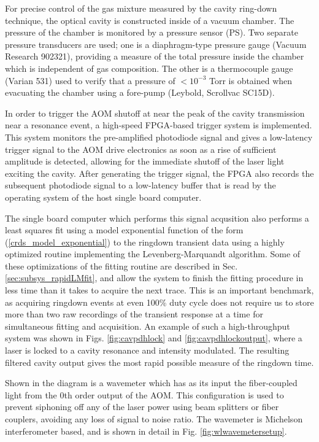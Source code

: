 \documentclass[12pt]{report}
\begin{document}
	For precise control of the gas mixture measured by the cavity ring-down technique, the optical cavity is constructed inside of a vacuum chamber. The pressure of the chamber is monitored by a pressure sensor (PS). Two separate pressure transducers are used; one is a diaphragm-type pressure gauge (Vacuum Research 902321), providing a measure of the total pressure inside the chamber which is independent of gas composition. The other is a thermocouple gauge (Varian 531) used to verify that a pressure of $<10^{-3}$ Torr is obtained when evacuating the chamber using a fore-pump (Leybold, Scrollvac SC15D).
	
	In order to trigger the AOM shutoff at near the peak of the cavity transmission near a resonance event, a high-speed FPGA-based trigger system is implemented. This system monitors the pre-amplified photodiode signal and gives a low-latency trigger signal to the AOM drive electronics as soon as a rise of sufficient amplitude is detected, allowing for the immediate shutoff of the laser light exciting the cavity. After generating the trigger signal, the FPGA also records the subsequent photodiode signal to a low-latency buffer that is read by the operating system of the host single board computer.
	
	The single board computer which performs this signal acqusition also performs a least squares fit using a model exponential function of the form (\ref{crds_model_exponential}) to the ringdown transient data using a highly optimized routine implementing the Levenberg-Marquandt algorithm. Some of these optimizations of the fitting routine are described in Sec. \ref{sec:subsys_rapidLMfit}, and allow the system to finish the fitting procedure in less time than it takes to acquire the next trace. This is an important benchmark, as acquiring ringdown events at even 100\% duty cycle does not require us to store more than two raw recordings of the transient response at a time for simultaneous fitting and acquisition. An example of such a high-throughput system was shown in Figs. \ref{fig:cavpdhlock} and \ref{fig:cavpdhlockoutput}, where a laser is locked to a cavity resonance and intensity modulated. The resulting filtered cavity output gives the most rapid possible measure of the ringdown time.
	
	Shown in the diagram is a wavemeter which has as its input the fiber-coupled light from the 0th order output of the AOM. This configuration is used to prevent siphoning off any of the laser power using beam splitters or fiber couplers, avoiding any loss of signal to noise ratio. The wavemeter is Michelson interferometer based, and is shown in detail in Fig. \ref{fig:wlwavemetersetup}.
	
\end{document}

